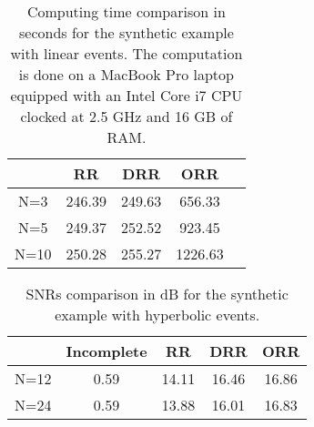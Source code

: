 {\begin{table}[h]
\caption{Computing time comparison in seconds for the synthetic example with linear events. The computation is done on a MacBook Pro laptop equipped with an Intel Core i7 CPU clocked at 2.5 GHz and 16 GB of RAM.}
\begin{center}
     \begin{tabular}{|c|c|c|c|c|} 
	  \hline  & RR  & DRR  & ORR \\ 
	  \hline N=3    &246.39  & 249.63 & 656.33   \\	  
	  \hline N=5    &249.37  & 252.52 &    923.45\\
	  \hline N=10  &250.28  &  255.27 & 1226.63 \\
       \hline
    \end{tabular} 
\end{center}
\label{tbl:time}
\end{table}

\begin{table}[h]
\caption{SNRs comparison in dB for the synthetic example with hyperbolic events.}
\begin{center}
     \begin{tabular}{|c|c|c|c|c|} 
	  \hline &Incomplete  & RR  & DRR & ORR \\ 
	  \hline N=12& 0.59 & 14.11 & 16.46 & 16.86 \\
	  \hline N=24& 0.59 & 13.88 & 16.01 & 16.83 \\
       \hline
    \end{tabular} 
\end{center}
\label{tbl:hyper}
\end{table}
\newpage









}
